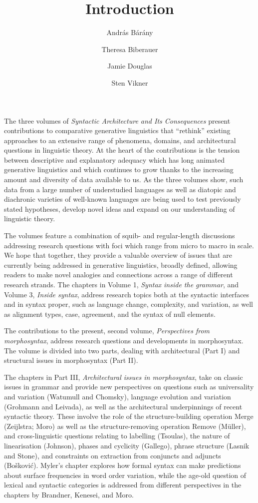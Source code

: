 \documentclass[output=paper]{langsci/langscibook}
\author{András Bárány\affiliation{Leiden University}\and
        Theresa Biberauer\affiliation{University of Cambridge, Stellenbosch
        University, University of the West Cape}\and
        Jamie Douglas\affiliation{University of Cambridge}\and
        Sten Vikner\affiliation{Aarhus University}}
\title{Introduction}
\begin{document}
\noindent The three volumes of \emph{Syntactic Architecture and Its
Consequences} present contributions to comparative generative linguistics that
\enquote{rethink} existing approaches to an extensive range of phenomena,
domains, and architectural questions in linguistic theory. At the heart of the
contributions is the tension between descriptive and explanatory adequacy which
has long animated generative linguistics and which continues to grow thanks to
the increasing amount and diversity of data available to us. As the three
volumes show, such data from a large number of understudied languages as well
as diatopic and diachronic varieties of well-known languages are being used to
test previously stated hypotheses, develop novel ideas and expand on our
understanding of linguistic theory.

The volumes feature a combination of squib- and regular-length discussions
addressing research questions with foci which range from micro to macro in
scale. We hope that together, they provide a valuable overview of issues that
are currently being addressed in generative linguistics, broadly defined,
allowing readers to make novel analogies and connections across a range of
different research strands. The chapters in Volume 1, \emph{Syntax inside the
grammar}, and Volume 3, \emph{Inside syntax}, address research topics both at
the syntactic interfaces and in syntax proper, such as language change,
complexity, and variation, as well as alignment types, case, agreement, and the
syntax of null elements.

The contributions to the present, second volume, \emph{Perspectives from
morphosyntax}, address research questions and developments in morphosyntax.
The volume is divided into two parts, dealing with architectural (Part I) and
structural issues in morphosyntax (Part II).

The chapters in Part III, \emph{Architectural issues in morphosyntax}, take on
classic issues in grammar and provide new perspectives on questions such as
universality and variation (Watumull and Chomsky), language evolution and
variation (Grohmann and Leivada), as well as the architectural underpinnings of
recent syntactic theory. These involve the role of the structure-building
operation Merge (Zeijlstra; Moro) as well as the structure-removing operation
Remove (Müller), and cross-linguistic questions relating to labelling
(Tsoulas), the nature of linearisation (Johnson), phases and cyclicity
(Gallego), phrase structure (Lasnik and Stone), and constraints on extraction
from conjuncts and adjuncts (Bošković). Myler’s chapter explores how formal
syntax can make predictions about surface frequencies in word order variation,
while the age-old question of lexical and syntactic categories is addressed
from different perspectives in the chapters by Brandner, Kenesei, and Moro.
\end{document}
